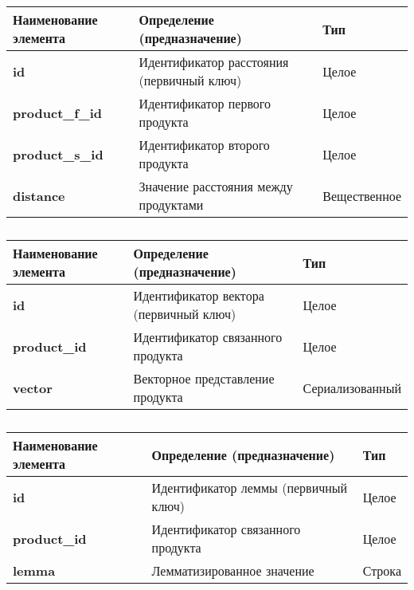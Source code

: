 \begin{longtable}{|p{3.5cm}|p{5cm}|p{5cm}|}
	\caption{} \\
	\hline
	\textbf{Наименование элемента}
	& \textbf{Определение (предназначение)}
	& \textbf{Тип} \\ \hline
	\endhead
	\textbf{id} & Идентификатор расстояния (первичный ключ) & Целое \\ \hline
	\textbf{product\_f\_id} & Идентификатор первого продукта & Целое \\ \hline
	\textbf{product\_s\_id} & Идентификатор второго продукта & Целое \\ \hline
	\textbf{distance} & Значение расстояния между продуктами & Вещественное \\ \hline
\end{longtable}

\begin{longtable}{|p{3.5cm}|p{5cm}|p{5cm}|}
	\caption{} \\
	\hline
	\textbf{Наименование элемента}
	& \textbf{Определение (предназначение)}
	& \textbf{Тип} \\ \hline
	\endhead
	\textbf{id} & Идентификатор вектора (первичный ключ) & Целое \\ \hline
	\textbf{product\_id} & Идентификатор связанного продукта & Целое \\ \hline
	\textbf{vector} & Векторное представление продукта & Сериализованный \\ \hline
\end{longtable}

\begin{longtable}{|p{3.5cm}|p{5cm}|p{5cm}|}
	\caption{} \\
	\hline
	\textbf{Наименование элемента}
	& \textbf{Определение (предназначение)}
	& \textbf{Тип} \\ \hline
	\endhead
	\textbf{id} & Идентификатор леммы (первичный ключ) & Целое \\ \hline
	\textbf{product\_id} & Идентификатор связанного продукта & Целое \\ \hline
	\textbf{lemma} & Лемматизированное значение & Строка \\ \hline
\end{longtable}

